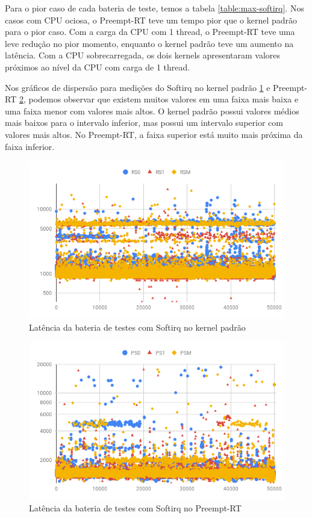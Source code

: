 Para o pior caso de cada bateria de teste, temos a tabela \ref{table:max-softirq}. Nos casos com CPU ociosa, o Preempt-RT teve um tempo pior que o kernel padrão para o pior caso. Com a carga da CPU com 1 thread, o Preempt-RT teve uma leve redução no pior momento, enquanto o kernel padrão teve um aumento na latência. Com a CPU sobrecarregada, os dois kernels apresentaram valores próximos ao nível da CPU com carga de 1 thread.

Nos gráficos de dispersão para medições do Softirq no kernel padrão \ref{grafico:r-softirq} e Preempt-RT \ref{grafico:p-softirq}, podemos observar que existem muitos valores em uma faixa mais baixa e uma faixa menor com valores mais altos. O kernel padrão possui valores médios mais baixos para o intervalo inferior, mas possui um intervalo superior com valores mais altos. No Preempt-RT, a faixa superior está muito mais próxima da faixa inferior.

\begin{figure}[!p]
    \centering
    \includegraphics[width=\textwidth]{graficos/rs-scatter.png}
    \caption{Latência da bateria de testes com Softirq no kernel padrão}
    \label{grafico:r-softirq}
\end{figure}

\begin{figure}[!p]
    \centering
    \includegraphics[width=\textwidth]{graficos/ps-scatter.png}
    \caption{Latência da bateria de testes com Softirq no Preempt-RT}
    \label{grafico:p-softirq}
\end{figure}

